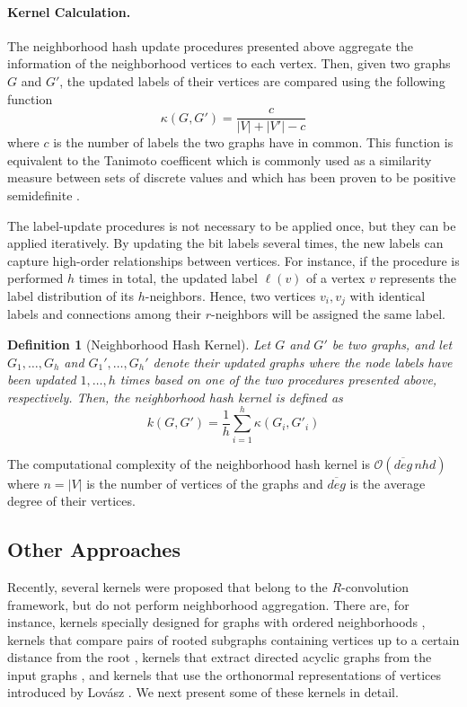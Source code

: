 \documentclass[twoside,11pt]{article}
\newtheorem{definition}{Definition}
\begin{document}
\paragraph{Kernel Calculation.}
The neighborhood hash update procedures presented above aggregate the information of the neighborhood vertices to each vertex.
Then, given two graphs $G$ and $G'$, the updated labels of their vertices are compared using the following function
\begin{equation}
    \kappa(G, G') = \frac{c}{|V| + |V'| - c}
\end{equation}
where $c$ is the number of labels the two graphs have in common.
This function is equivalent to the Tanimoto coefficent which is commonly used as a similarity measure between sets of discrete values and which has been proven to be positive semidefinite .

The label-update procedures is not necessary to be applied once, but they can be applied iteratively.
By updating the bit labels several times, the new labels can capture high-order relationships between vertices.
For instance, if the procedure is performed $h$ times in total, the updated label $\ell(v)$ of a vertex $v$ represents the label distribution of its $h$-neighbors.
Hence, two vertices $v_i, v_j$ with identical labels and connections among their $r$-neighbors will be assigned the same label.

\begin{definition}[Neighborhood Hash Kernel]
	Let $G$ and $G'$ be two graphs, and let $G_1, \ldots, G_h$ and $G_1', \ldots, G_h'$ denote their updated graphs where the node labels have been updated $1,\ldots,h$ times based on one of the two procedures presented above, respectively.
	Then, the neighborhood hash kernel is defined as
	\begin{equation}
		k(G, G') = \frac{1}{h} \sum_{i=1}^h \kappa(G_i, G'_i)
	\end{equation}
\end{definition}
The computational complexity of the neighborhood hash kernel is $\mathcal{O}(\overline{deg} \, nhd)$ where $n=|V|$ is the number of vertices of the graphs and $\overline{deg}$ is the average degree of their vertices.


\subsection{Other Approaches}
Recently, several kernels were proposed that belong to the $R$-convolution framework, but do not perform neighborhood aggregation.
There are, for instance, kernels specially designed for graphs with ordered neighborhoods , kernels that compare pairs of rooted subgraphs containing vertices up to a certain distance from the root , kernels that extract directed acyclic graphs from the input graphs , and kernels that use the orthonormal representations of vertices introduced by Lov\'asz .
We next present some of these kernels in detail.
\end{document}
